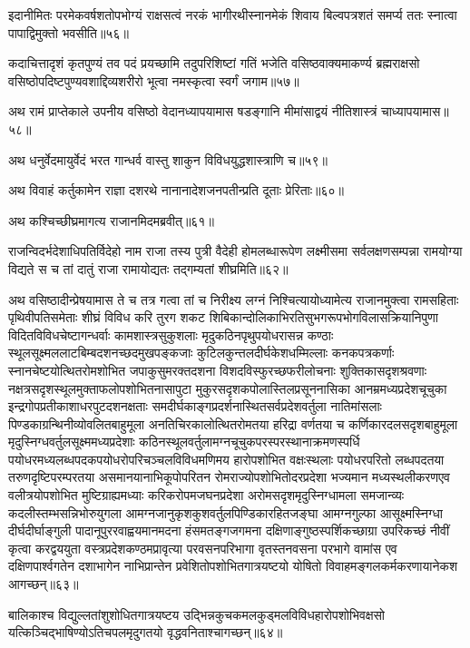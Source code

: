 \begin{flushleft}
इदानीमितः परमेकवर्षशतोपभोग्यं राक्षसत्वं नरकं भागीरथीस्नानमेकं शिवाय बिल्वपत्रशतं समर्प्य ततः स्नात्वा पापाद्विमुक्तो भवसीति॥५६॥

कदाचित्तादृशं कृतपुण्यं तव पदं प्रयच्छामि तदुपरिशिष्टां गतिं भजेति वसिष्ठवाक्यमाकर्ण्य ब्रह्मराक्षसो वसिष्ठोपदिष्टपुण्यवशाद्दिव्यशरीरो भूत्वा नमस्कृत्वा स्वर्गं जगाम॥५७॥

अथ रामं प्राप्तेकाले उपनीय वसिष्ठो वेदानध्यापयामास षडङ्गानि मीमांसाद्वयं नीतिशास्त्रं चाध्यापयामास॥५८॥

अथ धनुर्वेदमायुर्वेदं भरत गान्धर्व वास्तु शाकुन विविधयुद्धशास्त्राणि च॥५९॥

अथ विवाहं कर्तुकामेन राज्ञा दशरथे नानानादेशजनपतीन्प्रति दूताः प्रेरिताः॥६०॥

अथ कश्चिच्छीघ्रमागत्य राजानमिदमब्रवीत्॥६१॥

राजन्विदर्भदेशाधिपतिर्विदेहो नाम राजा तस्य पुत्री वैदेही होमलब्धारूपेण लक्ष्मीसमा सर्वलक्षणसम्पन्ना रामयोग्या विद्यते स च तां दातुं राजा रामायोद्यतः तद्गम्यतां शीघ्रमिति॥६२॥

अथ वसिष्ठादीन्प्रेषयामास ते च तत्र गत्वा तां च निरीक्ष्य लग्नं निश्चित्यायोध्यामेत्य राजानमुक्त्वा रामसहिताः पृथिवीपतिसमेताः शीघ्रं विविध करि तुरग शकट शिबिकान्दोलिकाभिरतिसुभगरूपभोगविलासक्रियानिपुणा विदितविविधचेष्टागन्धर्वाः कामशास्त्रसुकुशलाः मृदुकठिनपृथुपयोधरासन्न कण्ठाः स्थूलसूक्ष्मललाटबिम्बदशनच्छदमुखपङ्कजाः कुटिलकुन्तलदीर्घकेशधम्मिल्लाः कनकपत्रकर्णाः स्नानचेष्टयोत्थितरोमशोभित जपाकुसुमरक्तदशना विशदविस्फुरच्छफरीलोचनाः शुक्तिकासदृशश्रवणाः नक्षत्रसदृशस्थूलमुक्ताफलोपशोभितनासापुटा मुकुरसदृशकपोलास्तिलप्रसूननासिका आनम्रमध्यप्रदेशचूचुका इन्द्रगोपप्रतीकाशाधरपुटदशनक्षताः समदीर्घकाङ्गप्रदर्शनास्थितसर्वप्रदेशवर्तुला नातिमांसलाः पिण्डकाग्रन्थिनीव्योवलितबाहुमूला अनतिचिरकालोत्थितरोमतया हरिद्रा वर्णतया च कर्णिकारदलसदृशबाहुमूला मृदुस्निग्धवर्तुलसूक्ष्ममध्यप्रदेशाः कठिनस्थूलवर्तुलामग्नचूचुकपरस्परस्थानाक्रमणस्पर्धि पयोधरमध्यलब्धपदकपयोधरोपरिचञ्चलविविधमणिमय हारोपशोभित वक्षःस्थलाः पयोधरपरितो लब्धपदतया तरुणदृष्टिपरम्परतया असमानयानाभिकूपोपरितन रोमराज्योपशोभितोदरप्रदेशा भज्यमान मध्यस्थलीकरणएव वलीत्रयोपशोभित मुष्टिग्राह्यमध्याः करिकरोपमजघनप्रदेशा अरोमसदृशमृदुस्निग्धामला समजान्व्यः कदलीस्तम्भसन्निभोरुयुगला आमग्नजानुकृशकुशवर्तुलपिण्डिकारहितजङ्घा आमग्नगुल्फा आसूक्ष्मस्निग्धा दीर्घदीर्घाङ्गुली पादानूपुररवाह्वयमानमदना हंसमतङ्गजगमना दक्षिणाङ्गुष्ठस्पर्शिकच्छाग्रा उपरिकच्छं नीवीं कृत्वा करद्वययुता वस्त्रप्रदेशकण्ठमप्रावृत्या परवसनपरिभागा वृतस्तनवसना परभागे वामांस एव दक्षिणपार्श्वगतेन दशाभागेन नाभिप्रान्तेन प्रवेशितोपशोभितगात्रयष्टयो योषितो विवाहमङ्गलकर्मकरणायानेकश आगच्छन्॥६३॥

बालिकाश्च विद्युल्लतांशुशोधितगात्रयष्टय उद्भिन्नकुचकमलकुड्मलविविधहारोपशोभिवक्षसो यत्किञ्चिद्भाषिण्योऽतिचपलमृदुगतयो वृद्धवनिताश्चागच्छन्॥६४॥


\end{flushleft}
